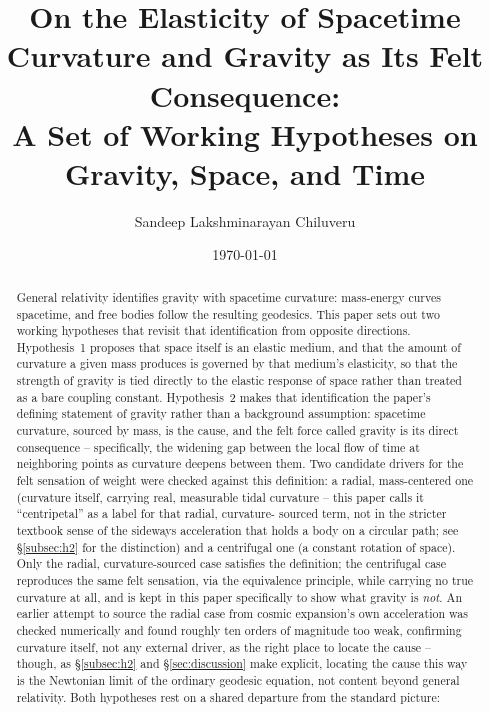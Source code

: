 \documentclass[12pt, a4paper]{article}
\title{On the Elasticity of Spacetime Curvature and Gravity as Its Felt Consequence: \\ A Set of Working Hypotheses on Gravity, Space, and Time}
\author{Sandeep Lakshminarayan Chiluveru}
\date{\today}
\begin{document}
\maketitle

\begin{abstract}
General relativity identifies gravity with spacetime curvature:
mass-energy curves spacetime, and free bodies follow the resulting
geodesics. This paper sets out two working hypotheses that revisit
that identification from opposite directions. Hypothesis~1 proposes
that space itself is an elastic medium, and that the amount of
curvature a given mass produces is governed by that medium's
elasticity, so that the strength of gravity is tied directly to the
elastic response of space rather than treated as a bare coupling
constant. Hypothesis~2 makes that identification the paper's defining statement
of gravity rather than a background assumption: spacetime curvature,
sourced by mass, is the cause, and the felt force called gravity is
its direct consequence -- specifically, the widening gap between the
local flow of time at neighboring points as curvature deepens between
them. Two candidate drivers for the felt sensation of weight were
checked against this definition: a radial, mass-centered one
(curvature itself, carrying real, measurable tidal curvature -- this
paper calls it ``centripetal'' as a label for that radial, curvature-
sourced term, not in the stricter textbook sense of the sideways
acceleration that holds a body on a circular path; see
\S\ref{subsec:h2} for the distinction) and a centrifugal one (a
constant rotation of space). Only the radial, curvature-sourced case
satisfies the definition; the centrifugal case reproduces the same
felt sensation, via the equivalence principle, while carrying no true
curvature at all, and is kept in this paper specifically to show what
gravity is \emph{not}. An earlier attempt to source the radial case
from cosmic expansion's own acceleration was checked numerically and
found roughly ten orders of magnitude too weak, confirming curvature
itself, not any external driver, as the right place to locate the
cause -- though, as \S\ref{subsec:h2} and \S\ref{sec:discussion} make
explicit, locating the cause this way is the Newtonian limit of the
ordinary geodesic equation, not content beyond general relativity.
Both hypotheses rest on a shared departure from the standard picture:

\end{abstract}
\end{document}
